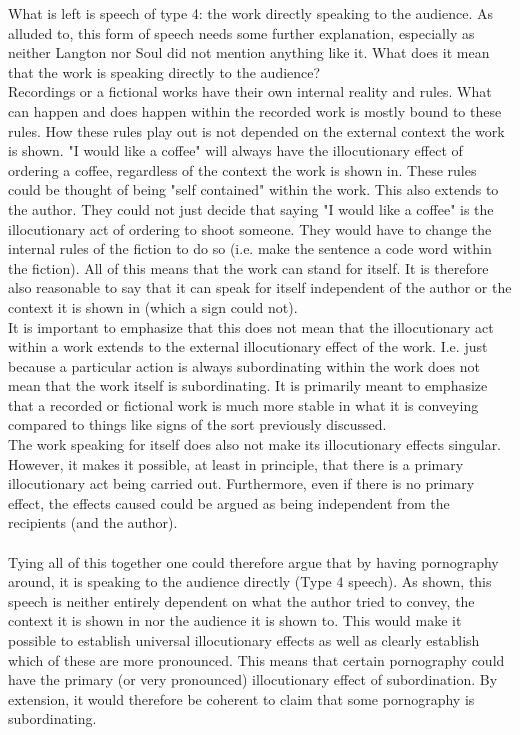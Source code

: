 \documentclass[14pt]{article}
\begin{document}
What is left is speech of type 4: the work directly speaking to the audience. As alluded to, this form of speech needs 
some further explanation, especially as neither Langton nor Soul did not mention anything like it. What does it mean that the work
is speaking directly to the audience?\\
Recordings or a fictional works have their own internal reality and rules. What can happen and does happen within the recorded
work is mostly bound to these rules. How these rules play out is not depended on the external context the work is shown.
"I would like a coffee" will always have the illocutionary effect of ordering a coffee, regardless of
the context the work is shown in.
These rules could be thought of being "self contained" within the work. This also extends
to the author. They could not just decide that saying "I would like a coffee" is the illocutionary act of ordering to shoot someone.
They would have to change the internal rules of the fiction to do so (i.e. make the sentence a code word within the fiction).
All of this means that the work can stand for itself. It is therefore also reasonable to say that it 
can speak for itself independent of the author or the
context it is shown in (which a sign could not).\\
It is important to emphasize that this does not mean that the illocutionary act within a work extends to the external
illocutionary effect of the work. I.e. just because a particular action is always subordinating within the work does not mean that the work itself
is subordinating. It is primarily meant to emphasize that a recorded or fictional work is much more stable in what it is conveying compared to 
things like signs of the sort previously discussed.\\
The work speaking for itself does also not make its illocutionary effects singular.  However, it makes it possible, at least in
principle, that there is a primary illocutionary act being carried out. Furthermore, even if there is no primary effect, the effects
caused could be argued as being independent from the recipients (and the author).\\
\\
Tying all of this together one could therefore argue that by having pornography around, it is speaking to the audience directly (Type 4 speech).
As shown, this speech is neither entirely dependent on what the author tried to convey, the context it is shown in nor the audience it is shown to.
This would make it possible to establish universal illocutionary effects as well as clearly establish which of these are more pronounced. This means
that certain pornography could have the primary (or very pronounced) illocutionary effect of subordination. 
By extension, it would therefore be coherent to claim that some pornography is subordinating.



\printbibliography
\end{document}

